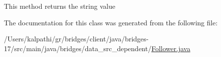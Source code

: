This method returns the string value 

The documentation for this class was generated from the following file\+:\begin{DoxyCompactItemize}
\item 
/\+Users/kalpathi/gr/bridges/client/java/bridges-\/17/src/main/java/bridges/data\+\_\+src\+\_\+dependent/\mbox{\hyperlink{_follower_8java}{Follower.\+java}}\end{DoxyCompactItemize}
